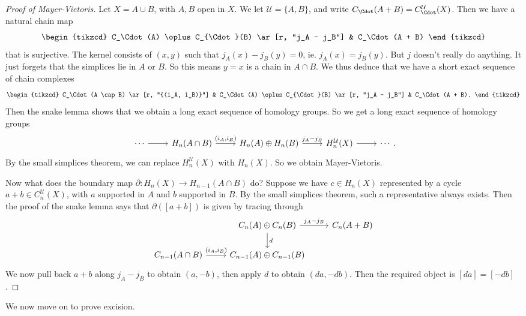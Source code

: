 \documentclass[a4paper]{article}
\begin{document}
\begin{proof}[Proof of Mayer-Vietoris]
  Let $X = A \cup B$, with $A, B$ open in $X$. We let $\mathcal{U} = \{A, B\}$, and write $C_\Cdot(A + B) = C_\Cdot^\mathcal{U} (X)$. Then we have a natural chain map
  \[
    \begin{tikzcd}
      C_\Cdot(A) \oplus C_{\Cdot}(B) \ar[r, "j_A - j_B"] & C_\Cdot(A + B)
    \end{tikzcd}
  \]
  that is surjective. The kernel consists of $(x, y)$ such that $j_A(x) - j_B(y) = 0$, ie. $j_A(x) = j_B(y)$. But $j$ doesn't really do anything. It just forgets that the simplices lie in $A$ or $B$. So this means $y = x$ is a chain in $A \cap B$. We thus deduce that we have a short exact sequence of chain complexes
  \[
    \begin{tikzcd}
      C_\Cdot(A \cap B) \ar[r, "{(i_A, i_B)}"] & C_\Cdot(A) \oplus C_{\Cdot}(B) \ar[r, "j_A - j_B"] & C_\Cdot(A + B).
    \end{tikzcd}
  \]
  Then the snake lemma shows that we obtain a long exact sequence of homology groups. So we get a long exact sequence of homology groups
  \[
    \begin{tikzcd}
      \cdots\ar[r] & H_n(A \cap B) \ar[r, "{(i_A, i_B)}"] & H_n(A) \oplus H_n(B) \ar[r, "j_A - j_B"] & H_n^\mathcal{U}(X) \ar[r] & \cdots
    \end{tikzcd}.
  \]
  By the small simplices theorem, we can replace $H_n^\mathcal{U}(X)$ with $H_n(X)$. So we obtain Mayer-Vietoris.

  Now what does the boundary map $\partial: H_n(X) \to H_{n - 1}(A \cap B)$ do? Suppose we have $c \in H_n(X)$ represented by a cycle $a + b \in C_n^\mathcal{U}(X)$, with $a$ supported in $A$ and $b$ supported in $B$. By the small simplices theorem, such a representative always exists. Then the proof of the snake lemma says that $\partial([a + b])$ is given by tracing through
  \[
    \begin{tikzcd}
      & C_n(A) \oplus C_n(B) \ar[r, "j_A - j_B"] \ar[d, "d"] & C_n(A + B)\\
      C_{n - 1}(A \cap B) \ar[r, "{(i_A, i_B)}"] & C_{n - 1}(A) \oplus C_{n - 1}(B)
    \end{tikzcd}
  \]
  We now pull back $a + b$ along $j_A - j_B$ to obtain $(a, -b)$, then apply $d$ to obtain $(da, -db)$. Then the required object is $[da] = [-db]$.
\end{proof}

We now move on to prove excision.
\end{document}
